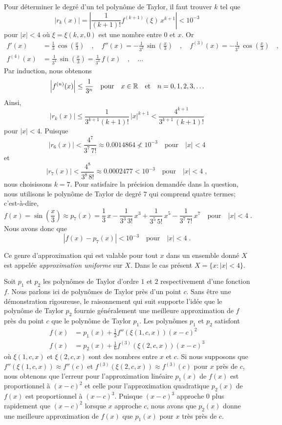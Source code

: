{\begin{egg}[\eng]
Pour déterminer le degré d'un tel polynôme de Taylor, il faut trouver
$k$ tel que
\[
\left| r_k(x) \right|
= \left| \frac{1}{(k+1)!} f^{(k+1)}(\xi) \, x^{k+1} \right| < 10^{-3}
\]
pour $|x|<4$ où $\xi = \xi(k,x,0)$ est une nombre entre $0$ et $x$.
Or
\begin{align*}
f'(x) &= \frac{1}{3} \, \cos\left(\frac{x}{3}\right) \quad , \quad
f''(x) = - \frac{1}{3^2} \, \sin\left(\frac{x}{3}\right) \quad , \quad
f^{(3)}(x) = -\frac{1}{3^3} \, \cos\left(\frac{x}{3}\right) \quad ,\\
f^{(4)}(x) &= \frac{1}{3^4} \, \sin\left(\frac{x}{3}\right)
= \frac{1}{3^4} \, f(x) \quad , \quad \ldots
\end{align*}
Par induction, nous obtenons
\[
\left| f^{(n)}(x) \right| \leq \frac{1}{3^n} \quad \text{pour} \quad
x \in \mathbb{R} \quad \text{et} \quad n=0,1,2,3,\ldots
\]
Ainsi,
\[
\left| r_k(x) \right|
\leq \frac{1}{3^{k+1} (k+1)!} \, |x|^{k+1}
< \frac{4^{k+1}}{3^{k+1} \, (k+1)!}
\]
pour $|x|<4$.  Puisque
\[
\left| r_6(x) \right| < \frac{4^7}{3^7 \, 7!} \approx 0.0014864 \not<
10^{-3} \quad \text{pour} \quad |x|<4
\]
et
\[
\left| r_7(x) \right| < \frac{4^8}{3^8 \, 8!} \approx 0.0002477 < 10^{-3}
 \quad \text{pour} \quad |x|<4 \; ,
\]
nous choisissons $k=7$.  Pour satisfaire la précision demandée dans la
question, nous utilisons le polynôme de Taylor de degré $7$ qui
comprend quatre termes; c'est-à-dire,
\[
f(x) = \sin\left(\frac{x}{3}\right) \approx p_7(x) =
\frac{1}{3}\,x - \frac{1}{3^3\,3!}\, x^3 + \frac{1}{3^5\, 5!}\, x^5
- \frac{1}{3^7\,7!} \, x^7 \quad \text{pour} \quad |x|<4 \; .
\]
Nous avons donc que
\[
\left| f(x) - p_7(x) \right| < 10^{-3} \quad \text{pour} \quad |x|<4 \; .
\]

Ce genre d'approximation qui est valable pour tout $x$ dans un
ensemble donné $X$ est appelée {\em approximation uniforme} sur $X$.
Dans le cas présent $X= \{ x : |x|<4\}$.
\end{egg}

Soit $p_1$ et $p_2$ les polynômes de Taylor d'ordre $1$ et $2$
respectivement d'une fonction $f$.  Nous parlons ici de polynômes de
Taylor près d'un point $c$.  Sans être une démonstration rigoureuse,
le raisonnement qui suit supporte l'idée que le polynôme de Taylor
$p_2$ fournie généralement une meilleure approximation de $f$ près du
point $c$ que le polynôme de Taylor $p_1$.  Les polynômes $p_1$ et
$p_2$ satisfont
\begin{align*}
f(x) &= p_1(x) + \frac{1}{2} f''(\xi(1,c,x)) (x-c)^2 \\
f(x) &= p_2(x) + \frac{1}{6} f^{(3)}(\xi(2,c,x)) (x-c)^3
\end{align*}
où $\xi(1,c,x)$ et $\xi(2,c,x)$ sont des nombres entre $x$ et $c$.  Si nous
supposons que $f''(\xi(1,c,x)) \approx f''(c)$ et
$f^{(3)}(\xi(2,c,x)) \approx f^{(3)}(c)$ pour $x$ près de $c$, nous
obtenons que l'erreur pour l'approximation linéaire $p_1(x)$ de $f(x)$
est proportionnel à $(x-c)^2$ et celle pour l'approximation
quadratique $p_2(x)$ de $f(x)$ est proportionnel à $(x-c)^3$.  Puisque
$(x-c)^3$ approche $0$ plus rapidement que $(x-c)^2$ lorsque $x$
approche $c$, nous avons que $p_2(x)$ donne une meilleure approximation de
$f(x)$ que $p_1(x)$ pour $x$ très près de $c$.

}
